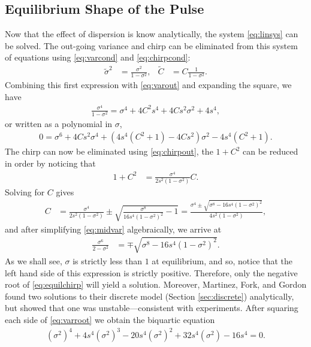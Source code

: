 \subsection{Equilibrium Shape of the Pulse}
Now that the effect of dispersion is know analytically, the system \eqref{eq:linsys} can be solved. The out-going variance and chirp can be eliminated from this system of equations using \eqref{eq:varcond} and \eqref{eq:chirpcond}:
\begin{align*}
\widetilde{\sigma}^2 &= \frac{\sigma^2}{1 - \sigma^2}, & \widetilde{C} &= C \frac{1}{1 - \sigma^2}.
\end{align*}
Combining this first expression with \eqref{eq:varout} and expanding the square, we have
\begin{align*}
\frac{\sigma^4}{1 - \sigma^2} = \sigma^4 + 4 C^2 s^4 + 4 C s^2 \sigma^2 + 4s^4,
\end{align*}
or written as a polynomial in $\sigma$,
\begin{align}
0 = \sigma^6 + 4 C s^2 \sigma^4 + \left( 4s^4 (C^2 + 1) - 4 C s^2 \right) \sigma^2 - 4s^4 (C^2 + 1).
\label{eq:midvar}
\end{align}
The chirp can now be eliminated using \eqref{eq:chirpout}, the $1+C^2$ can be reduced in order by noticing that
\begin{align*}
1 + C^2 &= \frac{\sigma^4}{2s^2(1 - \sigma^2)} C.
\end{align*}
Solving for $C$ gives
\begin{align}
\label{eq:equilchirp}
C &= \frac{\sigma^4}{2s^2(1 - \sigma^2)} \pm \sqrt{\frac{\sigma^8}{16s^4(1 - \sigma^2)^2} - 1} = \frac{\sigma^4 \pm \sqrt{\sigma^8 - 16s^4(1 - \sigma^2)^2}}{4s^2(1 - \sigma^2)},
\end{align}
and after simplifying \eqref{eq:midvar} algebraically, we arrive at
\begin{align}
\frac{\sigma^6}{2 - \sigma^2} &= \mp \sqrt{\sigma^8 - 16s^4(1 - \sigma^2)^2}.
\label{eq:varroot}
\end{align}
As we shall see, $\sigma$ is strictly less than $1$ at equilibrium, and so, notice that the left hand side of this expression is strictly positive. Therefore, only the negative root of \eqref{eq:equilchirp} will yield a solution. Moreover, Martinez, Fork, and Gordon \cite{martinez1984} found two solutions to their discrete model (Section \ref{sec:discrete}) analytically, but showed that one was unstable---consistent with experiments. After squaring each side of \eqref{eq:varroot} we obtain the biquartic equation
\begin{align}
\label{eq:var}
\left( \sigma^2 \right)^4 + 4 s^4 \left( \sigma^2 \right)^3 - 20 s^4 \left( \sigma^2 \right)^2 + 32 s^4 \left( \sigma^2 \right) - 16 s^4 = 0.
\end{align}
